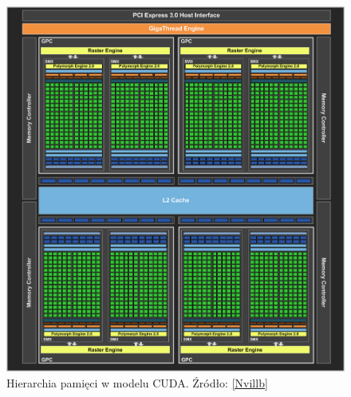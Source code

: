 \begin{figure}[H]
\centering
\includegraphics[scale=0.3]{images/kepler-overview.png}
\caption{Hierarchia pamięci w modelu CUDA. Źródło: \ref{Nvillb}}
\label{hier}
\end{figure}

